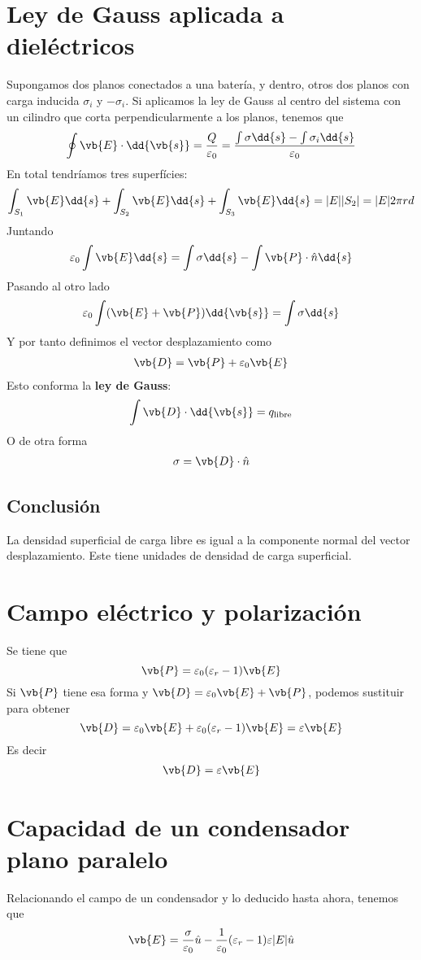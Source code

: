 \documentclass{./FisicaII.tex}
\begin{document}
\section{Ley de Gauss aplicada a dieléctricos}
Supongamos dos planos conectados a una batería, y dentro, otros dos planos con carga
inducida \(\sigma _{i}\) y \(-\sigma _{i}\). Si aplicamos la ley de Gauss al centro del
sistema con un cilindro que corta perpendicularmente a los planos, tenemos que
\[
	\oint \vb{E} \cdot \dd{\vb{s}} = \frac{Q}{\varepsilon_{0}} = 
	\frac{\int \sigma  \dd{s} - \int \sigma _{i}\dd{s}}{\varepsilon _{0}}
\]
En total tendríamos tres superfícies:
\[
	\int_{S_{1}} \vb{E} \dd{s} + \int_{S_{2}} \vb{E}\dd{s} + \int_{S_{3}}\vb{E}\dd{s}
	= |E||S_{2}| = |E|2 \pi r d
\]
Juntando
\[
	\varepsilon _{0} \int \vb{E} \dd{s} = \int \sigma \dd{s} - \int \vb{P} \cdot \hat{n}\dd{s}
\]
Pasando al otro lado
\[
	\varepsilon _{0} \int (\vb{E}+\vb{P} )\dd{\vb{s}} = \int \sigma \dd{s}
\]
Y por tanto definimos el vector desplazamiento como
\begin{equation}
	\begin{split}
		\vb{D} = \vb{P} + \varepsilon _{0} \vb{E}
	\end{split}
\end{equation}
Esto conforma la \textbf{ley de Gauss}:
\begin{equation}
	\begin{split}
		\int \vb{D} \cdot \dd{\vb{s}} = q_{\text{libre}}
	\end{split}
\end{equation}
O de otra forma
\begin{equation}
	\begin{split}
		\sigma = \vb{D} \cdot \hat{n}
	\end{split}
\end{equation}
\subsection{Conclusión}
La densidad superficial de carga libre es igual a la componente normal del vector
desplazamiento. Este tiene unidades de densidad de carga superficial.
\section{Campo eléctrico y polarización}
Se tiene que
\[
	\vb{P} = \varepsilon _{0}(\varepsilon _{r}-1) \vb{E}
\]
Si \(\vb{P}\) tiene esa forma y \(\vb{D} = \varepsilon_{0}\vb{E} + \vb{P}\), podemos
sustituir para obtener
\[
	\vb{D} = \varepsilon _{0}\vb{E} + \varepsilon _{0}(\varepsilon _{r}-1)\vb{E}=
	\varepsilon  \vb{E}
\]
Es decir
\begin{equation}
	\begin{split}
		\vb{D} = \varepsilon \vb{E}
	\end{split}
\end{equation}
\section{Capacidad de un condensador plano paralelo}
Relacionando el campo de un condensador y lo deducido hasta ahora, tenemos que
\[
	\vb{E} = \frac{\sigma }{\varepsilon _{0}} \hat{u} - \frac{1}{\varepsilon _{0}}
	(\varepsilon _{r}-1)\varepsilon |E| \hat{u}
\]
\end{document}
